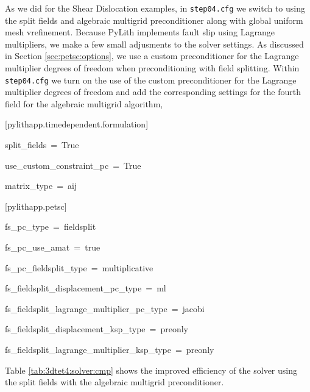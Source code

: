 As we did for the Shear Dislocation examples, in \texttt{step04.cfg}
we switch to using the split fields and algebraic multigrid preconditioner
along with global uniform mesh vrefinement. Because PyLith implements
fault slip using Lagrange multipliers, we make a few small adjusments
to the solver settings. As discussed in Section \vref{sec:petsc:options},
we use a custom preconditioner for the Lagrange multiplier degrees
of freedom when preconditioning with field splitting. Within \texttt{step04.cfg}
we turn on the use of the custom preconditioner for the Lagrange multiplier
degrees of freedom and add the corresponding settings for the fourth
field for the algebraic multigrid algorithm,
\begin{lyxcode}
{[}pylithapp.timedependent.formulation{]}

split\_fields~=~True

use\_custom\_constraint\_pc~=~True

matrix\_type~=~aij



{[}pylithapp.petsc{]}

fs\_pc\_type~=~fieldsplit

fs\_pc\_use\_amat~=~true

fs\_pc\_fieldsplit\_type~=~multiplicative

fs\_fieldsplit\_displacement\_pc\_type~=~ml

fs\_fieldsplit\_lagrange\_multiplier\_pc\_type~=~jacobi

fs\_fieldsplit\_displacement\_ksp\_type~=~preonly

fs\_fieldsplit\_lagrange\_multiplier\_ksp\_type~=~preonly
\end{lyxcode}
Table \vref{tab:3dtet4:solver:cmp} shows the improved efficiency of
the solver using the split fields with the algebraic multigrid preconditioner.
